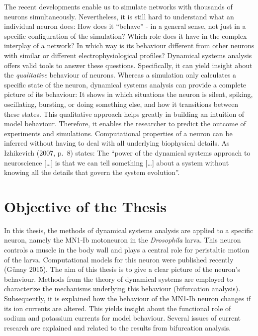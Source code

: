 \documentclass[12pt,a4paper,]{report}
\begin{document}
The recent developments enable us to simulate networks with thousands of
neurons simultaneously. Nevertheless, it is still hard to understand
what an individual neuron does: How does it ``behave'' - in a general
sense, not just in a specific configuration of the simulation? Which
role does it have in the complex interplay of a network? In which way is
its behaviour different from other neurons with similar or different
electrophysiological profiles? Dynamical systems analysis offers valid
tools to answer these questions. Specifically, it can yield insight
about the \emph{qualitative} behaviour of neurons. Whereas a simulation
only calculates a specific state of the neuron, dynamical systems
analysis can provide a complete picture of its behaviour: It shows in
which situations the neuron is silent, spiking, oscillating, bursting,
or doing something else, and how it transitions between these states.
This qualitative approach helps greatly in building an intuition of
model behaviour. Therefore, it enables the researcher to predict the
outcome of experiments and simulations. Computational properties of a
neuron can be inferred without having to deal with all underlying
biophysical details. As Izhikevich (2007, p.~8) states: The ``power of
the dynamical systems approach to neuroscience {[}\ldots{}{]} is that we
can tell something {[}\ldots{}{]} about a system without knowing all the
details that govern the system evolution''.

\section{Objective of the Thesis}\label{objective-of-the-thesis}

In this thesis, the methods of dynamical systems analysis are applied to
a specific neuron, namely the MN1-Ib motoneuron in the \emph{Drosophila}
larva. This neuron controls a muscle in the body wall and plays a
central role for peristaltic motion of the larva. Computational models
for this neuron were published recently (Günay 2015). The aim of this
thesis is to give a clear picture of the neuron's behaviour. Methods
from the theory of dynamical systems are employed to characterize the
mechanisms underlying this behaviour (bifurcation analysis).
Subsequently, it is explained how the behaviour of the MN1-Ib neuron
changes if its ion currents are altered. This yields insight about the
functional role of sodium and potassium currents for model behaviour.
Several issues of current research are explained and related to the
results from bifurcation analysis.
\end{document}
